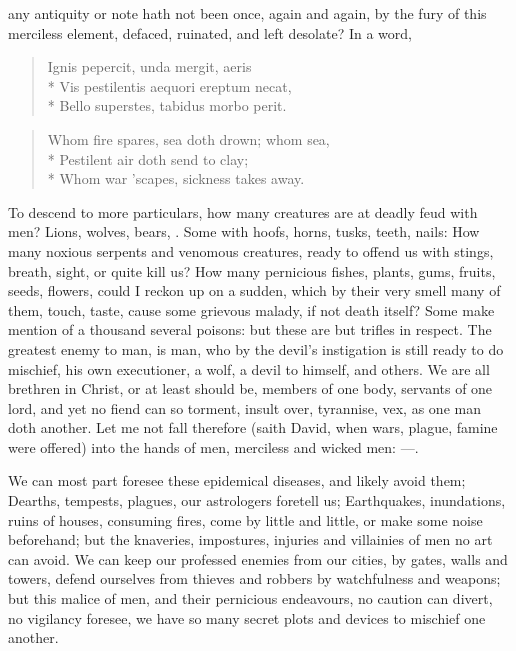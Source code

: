 {any antiquity or note hath not been once, again and again, by the fury
of this merciless element, defaced, ruinated, and left desolate? In a
word,
%
\begin{verse}
\textlatin{Ignis pepercit, unda mergit, aeris}\\*
\textlatin{Vis pestilentis aequori ereptum necat,}\\*
\textlatin{Bello superstes, tabidus morbo perit.}
\end{verse}
\translationrule
\begin{verse}
Whom fire spares, sea doth drown; whom sea,\\*
Pestilent air doth send to clay;\\*
Whom war 'scapes, sickness takes away.
\end{verse}
%
To descend to more particulars, how many creatures are at deadly feud
with men? Lions, wolves, bears, \etc{}. Some with hoofs, horns, tusks,
teeth, nails: How many noxious serpents and venomous creatures, ready
to offend us with stings, breath, sight, or quite kill us? How many
pernicious fishes, plants, gums, fruits, seeds, flowers, \etc{} could I
reckon up on a sudden, which by their very smell many of them, touch,
taste, cause some grievous malady, if not death itself? Some make
mention of a thousand several poisons: but these are but trifles in
respect. The greatest enemy to man, is man, who by the devil's
instigation is still ready to do mischief, his own executioner, a wolf,
a devil to himself, and others. We are all brethren in Christ, or
at least should be, members of one body, servants of one lord, and yet
no fiend can so torment, insult over, tyrannise, vex, as one man doth
another. Let me not fall therefore (saith David, when wars, plague,
famine were offered) into the hands of men, merciless and wicked men:
---.

We can most part foresee these epidemical diseases, and likely avoid
them; Dearths, tempests, plagues, our astrologers foretell us;
Earthquakes, inundations, ruins of houses, consuming fires, come by
little and little, or make some noise beforehand; but the knaveries,
impostures, injuries and villainies of men no art can avoid. We can
keep our professed enemies from our cities, by gates, walls and towers,
defend ourselves from thieves and robbers by watchfulness and weapons;
but this malice of men, and their pernicious endeavours, no caution can
divert, no vigilancy foresee, we have so many secret plots and devices
to mischief one another.

}
